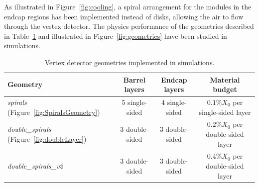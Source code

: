 As illustrated in Figure~\ref{fig:cooling}, a spiral arrangement for
the modules in the endcap regions has been implemented instead of
disks, allowing the air to flow through the vertex detector. The
physics performance of the geometries described in
Table~\ref{tab:geometries} and illustrated in
Figure~\ref{fig:geometries} have been studied in simulations.

\begin{table}[htbp]
  \caption{Vertex detector geometries implemented in simulations.}
  \begin{center}
    \begin{tabular}{ l c c c }
      \hline
      Geometry & Barrel layers & Endcap layers & Material budget \\ \hline \hline
      \emph{spirals} (Figure~\ref{fig:SpiralsGeometry}) & 5 single-sided & 4 single-sided & $0.1\%X_{0}$ per single-sided layer  \\ %
      \emph{double\_spirals} (Figure~\ref{fig:doubleLayer}) & 3 double-sided & 3 double-sided & $0.2\%X_{0}$ per double-sided layer  \\ %
      \emph{double\_spirals\_v2} & 3 double-sided & 3 double-sided & $0.4\%X_{0}$ per double-sided layer  \\ \hline  
    \end{tabular}
  \end{center}
  \label{tab:geometries}
\end{table}


